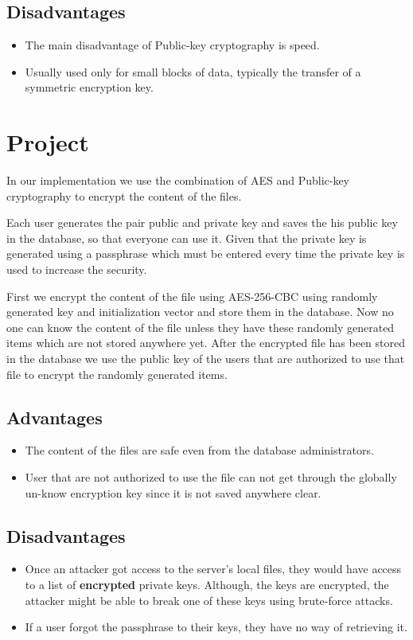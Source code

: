 \subsection{Disadvantages}
\begin{itemize}
	\item The main disadvantage of Public-key cryptography is speed.
	\item Usually used only for small blocks of data, typically the transfer of a symmetric encryption key.
\end{itemize}

\section{Project}
\par In our implementation we use the combination of AES and Public-key cryptography to encrypt the content of the files.
\par Each user generates the pair public and private key and saves the his public key in the database, so that everyone can use it. Given that the private key is generated using a passphrase which must be entered every time the private key is used to increase the security.
\par First we encrypt the content of the file using AES-256-CBC using randomly generated key and initialization vector and store them in the database. Now no one can know the content of the file unless they have these randomly generated items which are not stored anywhere yet. After the encrypted file has been stored in the database we use the public key of the users that are authorized to use that file to encrypt the randomly generated items.
\subsection{Advantages}
\begin{itemize}
	\item The content of the files are safe even from the database administrators.
	\item User that are not authorized to use the file can not get through the globally un-know encryption key since it is not saved anywhere clear.
\end{itemize}
\subsection{Disadvantages}
\begin{itemize}
	\item Once an attacker got access to the server's local files, they would have access to a list of \textbf{encrypted} private keys. Although, the keys are encrypted, the attacker might be able to break one of these keys using brute-force attacks.
	\item If a user forgot the passphrase to their keys, they have no way of retrieving it.
\end{itemize}

